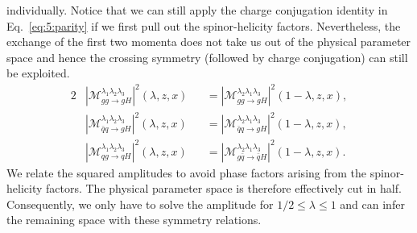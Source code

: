individually. Notice that we can still apply the charge conjugation identity in Eq.~\eqref{eq:5:parity} if we first pull out the spinor-helicity factors. Nevertheless, the exchange of the first two momenta does not take us out of the physical parameter space and hence the crossing symmetry (followed by charge conjugation) can still be exploited.
\begin{alignat}{2}
& |\mathcal{M}_{gg \rightarrow g H}^{\lambda_1 \lambda_2 \lambda_3} |^2(\lambda, z, x) &&= |\mathcal{M}_{gg \rightarrow g H}^{\lambda_2 \lambda_1 \lambda_3}|^2 (1 - \lambda, z, x), \label{eq:5:symmetry_1} \\
& |\mathcal{M}_{\bar{q}q \rightarrow g H}^{\lambda_1 \lambda_2 \lambda_3}|^2 (\lambda , z, x) &&= |\mathcal{M}_{\bar{q} q \rightarrow g H}^{\lambda_2 \lambda_1 \lambda_3}|^2 (1 - \lambda , z, x),\label{eq:5:symmetry_2} \\
& |\mathcal{M}_{qg \rightarrow qH}^{\lambda_1 \lambda_2 \lambda_3}|^2 (\lambda, z, x) &&= |\mathcal{M}_{g \bar{q} \rightarrow \bar{q} H}^{\lambda_2 \lambda_1 \lambda_3}|^2 (1 - \lambda, z, x). \label{eq:5:symmetry_3}
\end{alignat}
We relate the squared amplitudes to avoid phase factors arising from the spinor-helicity factors. The physical parameter space is therefore effectively cut in half. Consequently, we only have to solve the amplitude for $1/2 \le \lambda \le 1$ and can infer the remaining space with these symmetry relations.

